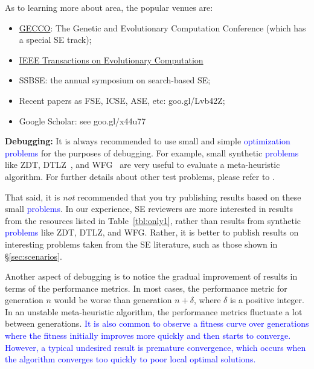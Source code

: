 \documentclass[sigconf,anonymous,review]{acmart}
\newcommand\TODO[1]{\textcolor{ScarletRed}{\textbf{\colorbox{yellow}{\small TODO:}} \emph{#1}}\xspace}
\newcommand\llm[1]{\textcolor{blue}{#1\xspace}}
\begin{document}
As to learning more about area, the popular venues are: 
\begin{itemize}
\item \href{http://gecco-2018.sigevo.org/index.html/HomePage}{GECCO}: The Genetic and Evolutionary Computation Conference (which has a special SE track);
\item \href{http://ieeexplore.ieee.org/xpl/RecentIssue.jsp?punumber=4235}{IEEE Transactions on Evolutionary Computation}
\item SSBSE: the annual symposium on search-based SE;
\item Recent papers   as FSE, ICSE, ASE, etc: goo.gl/Lvb42Z;
\item Google Scholar: see  goo.gl/x44u77
\end{itemize}
  \noindent\textbf{Debugging: } It is always recommended to use small and simple \llm{optimization problems} for the purposes of debugging. For example, small synthetic \llm{problems} like ZDT, DTLZ~\cite{deb2005scalable}, and WFG~\cite{huband2006review} are very useful to evaluate a meta-heuristic algorithm. For further details about other test problems, please refer to \cite{huband2006review}.  
  
  That said, it is {\em not} recommended that you try publishing results based on these small \llm{problems}. In our experience, SE reviewers are more interested in results from the resources listed in Table~\ref{tbl:only1}, rather than results from   synthetic \llm{problems} like ZDT, DTLZ, and WFG. Rather, it is better to publish results on interesting
  problems taken from the SE literature, such as those shown in \S\ref{sec:scenarios}.
  
  Another aspect of debugging is to notice the gradual improvement of results in terms of the performance metrics. In most cases, the performance metric for generation $n$ would be worse than generation $n+\delta$, where $\delta$ is a positive integer. In an unstable meta-heuristic algorithm, the performance metrics fluctuate a lot between generations. 
  \llm{It is also common to observe a fitness curve over generations where the fitness initially improves more quickly and then starts to converge. However, a typical undesired result is premature convergence, which occurs when the algorithm converges too quickly to poor local optimal solutions.}
\end{document}
